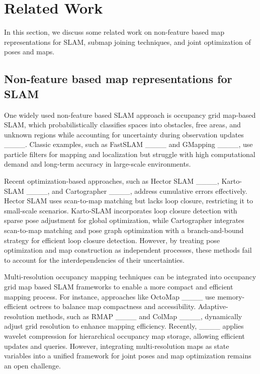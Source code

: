 \section{Related Work}
\label{Sec_related_work}

In this section, we discuss some related work on non-feature based map representations for SLAM, submap joining techniques, and joint optimization of poses and maps. 

\subsection{Non-feature based map representations for SLAM}\label{Sec_related_a}
One widely used non-feature based SLAM approach is occupancy grid map-based SLAM, which probabilistically classifies spaces into obstacles, free areas, and unknown regions while accounting for uncertainty during observation updates ____. Classic examples, such as FastSLAM ____ and GMapping ____, use particle filters for mapping and localization but struggle with high computational demand and long-term accuracy in large-scale environments.

Recent optimization-based approaches, such as Hector SLAM ____, Karto-SLAM ____, and Cartographer ____, address cumulative errors effectively. Hector SLAM uses scan-to-map matching but lacks loop closure, restricting it to small-scale scenarios. Karto-SLAM incorporates loop closure detection with sparse pose adjustment for global optimization, while Cartographer integrates scan-to-map matching and pose graph optimization with a branch-and-bound strategy for efficient loop closure detection. However, by treating pose optimization and map construction as independent processes, these methods fail to account for the interdependencies of their uncertainties.

Multi-resolution occupancy mapping techniques can be integrated into occupancy grid map based SLAM frameworks to enable a more compact and efficient mapping process. For instance, approaches like OctoMap ____ use memory-efficient octrees to balance map compactness and accessibility. Adaptive-resolution methods, such as RMAP ____ and ColMap ____, dynamically adjust grid resolution to enhance mapping efficiency. Recently, ____ applies wavelet compression for hierarchical occupancy map storage, allowing efficient updates and queries. However, integrating multi-resolution maps as state variables into a unified framework for joint poses and map optimization remains an open challenge.


